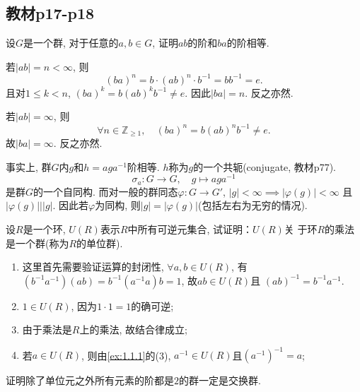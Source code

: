\subsection{教材p17-p18}

\begin{problem}\label{ex:1.3.1}
    设$G$是一个群, 对于任意的$a, b \in G$, 证明$ab$的阶和$ba$的阶相等.
\end{problem}

\begin{solution}
    若$|ab| = n < \infty$, 则
\[
    (ba)^n = b \cdot (ab)^n \cdot b^{-1} = bb^{-1} = e.
\] 
    且对$1 \leqslant k < n$, $(ba)^k = b(ab)^kb^{-1} \neq e$.
因此$|ba| = n$. 反之亦然.
    
    若$|ab| = \infty$, 则
\[
    \forall n \in \mathbb{Z}_{\geqslant 1}, \quad (ba)^n = b(ab)^nb^{-1} \neq e.
\]
    故$|ba| = \infty$. 反之亦然.

    事实上, 群$G$内$g$和$h = aga^{-1}$阶相等. $h$称为$g$的一个共轭(conjugate, 教材p77).
\[
    \sigma_a: G \to G, \quad g \mapsto aga^{-1}
\]
是群$G$的一个自同构. 而对一般的群同态$\varphi: G \to G'$, $|g| < \infty \implies |\varphi(g)| < \infty$
且$|\varphi(g)| \Big| |g|$. 因此若$\varphi$为同构, 则$|g| = |\varphi(g)|$(包括左右为无穷的情况).
\end{solution}

\begin{problem}\label{ex:1.3.2}
    设$R$是一个环, $U(R)$表示$R$中所有可逆元集合, 试证明：$U(R)$关
于环$R$的乘法是一个群(称为$R$的单位群).
\end{problem}

\begin{solution}
    \begin{enumerate}[(1)]
        \item 这里首先需要验证运算的封闭性, $\forall a, b \in U(R)$, 有
    $(b^{-1}a^{-1})(ab) = b^{-1}(a^{-1}a)b = 1$, 故$ab \in U(R)$且
    $(ab)^{-1} = b^{-1}a^{-1}$.
        \item $1 \in U(R)$, 因为$1 \cdot 1 = 1$的确可逆;
        \item 由于乘法是$R$上的乘法, 故结合律成立;
        \item 若$a \in U(R)$, 则由\ref{ex:1.1.1}的(3), $a^{-1} \in U(R)$且$(a^{-1})^{-1} = a$;
    \end{enumerate}
\end{solution}

\begin{problem}
    证明除了单位元之外所有元素的阶都是$2$的群一定是交换群.
\end{problem}

